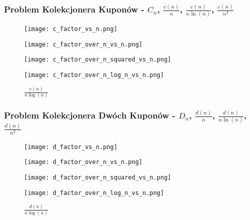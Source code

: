 \documentclass{article}
\begin{document}
\subsubsection{Problem Kolekcjonera Kuponów - $C_n$, $\frac{c(n)}{n}$, $\frac{c(n)}{n\ln(n)}$, $\frac{c(n)}{n^2}$}

\begin{figure}[H]
    \centering
    \begin{minipage}{0.24\textwidth}
        \centering
        \texttt{[image: c\_factor\_vs\_n.png]}
        \caption{$C(n)$}
    \end{minipage}
    \begin{minipage}{0.24\textwidth}
        \centering
        \texttt{[image: c\_factor\_over\_n\_vs\_n.png]}
        \caption{$\frac{c(n)}{n}$}
    \end{minipage}
    \begin{minipage}{0.24\textwidth}
        \centering
        \texttt{[image: c\_factor\_over\_n\_squared\_vs\_n.png]}
        \caption{$\frac{c(n)}{n^2}$}
    \end{minipage}
        \begin{minipage}{0.24\textwidth}
        \centering
        \texttt{[image: c\_factor\_over\_n\_log\_n\_vs\_n.png]}
        \caption{$\frac{c(n)}{n \log(n)}$}
    \end{minipage}
\end{figure}


\subsubsection{Problem Kolekcjonera Dwóch Kuponów - $D_n$, $\frac{d(n)}{n}$, $\frac{d(n)}{n\ln(n)}$, $\frac{d(n)}{n^2}$}

\begin{figure}[H]
    \centering
    \begin{minipage}{0.24\textwidth}
        \centering
        \texttt{[image: d\_factor\_vs\_n.png]}
        \caption{$D(n)$}
    \end{minipage}
    \begin{minipage}{0.24\textwidth}
        \centering
        \texttt{[image: d\_factor\_over\_n\_vs\_n.png]}
        \caption{$\frac{d(n)}{n}$}
    \end{minipage}
    \begin{minipage}{0.24\textwidth}
        \centering
        \texttt{[image: d\_factor\_over\_n\_squared\_vs\_n.png]}
        \caption{$\frac{d(n)}{n^2}$}
    \end{minipage}
    \begin{minipage}{0.24\textwidth}
        \centering
        \texttt{[image: d\_factor\_over\_n\_log\_n\_vs\_n.png]}
        \caption{$\frac{d(n)}{n \log(n)}$}
    \end{minipage}
\end{figure}
\end{document}
